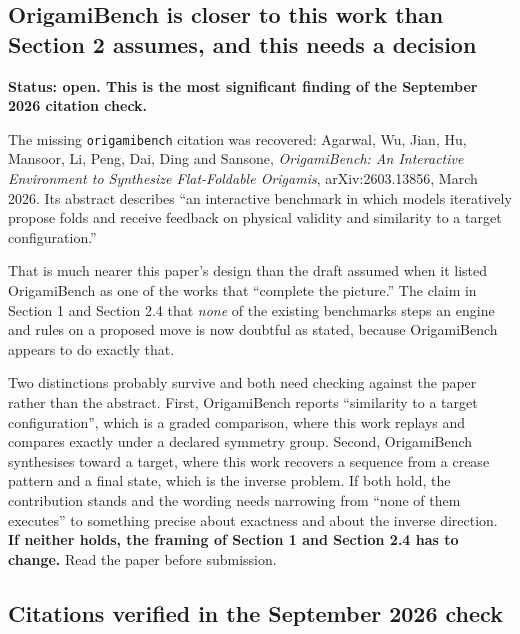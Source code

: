 \subsection{OrigamiBench is closer to this work than Section 2 assumes, and this needs a decision}

\textbf{Status: open. This is the most significant finding of the September 2026 citation check.}

The missing \texttt{origamibench} citation was recovered: Agarwal, Wu, Jian, Hu, Mansoor, Li, Peng,
Dai, Ding and Sansone, \emph{OrigamiBench: An Interactive Environment to Synthesize Flat-Foldable
Origamis}, arXiv:2603.13856, March 2026. Its abstract describes ``an interactive benchmark in which
models iteratively propose folds and receive feedback on physical validity and similarity to a
target configuration.''

That is much nearer this paper's design than the draft assumed when it listed OrigamiBench as one
of the works that ``complete the picture.'' The claim in Section 1 and Section 2.4 that
\emph{none} of the existing benchmarks steps an engine and rules on a proposed move is now doubtful
as stated, because OrigamiBench appears to do exactly that.

Two distinctions probably survive and both need checking against the paper rather than the
abstract. First, OrigamiBench reports ``similarity to a target configuration'', which is a graded
comparison, where this work replays and compares exactly under a declared symmetry group. Second,
OrigamiBench synthesises toward a target, where this work recovers a sequence from a crease pattern
and a final state, which is the inverse problem. If both hold, the contribution stands and the
wording needs narrowing from ``none of them executes'' to something precise about exactness and
about the inverse direction. \textbf{If neither holds, the framing of Section 1 and Section 2.4 has
to change.} Read the paper before submission.

\subsection{Citations verified in the September 2026 check}

